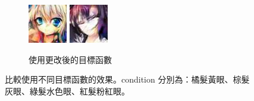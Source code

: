 \documentclass[fleqn,a4paper,12pt]{article}
\begin{document}
\begin{figure}[H]
\begin{subfigure}{0.45\textwidth}
  \includegraphics[width=0.2\linewidth]{imgs/iwgan-230-max-loss/4-5-0.jpg}
  \includegraphics[width=0.2\linewidth]{imgs/iwgan-230-max-loss/5-3-0.jpg}
  \caption{使用更改後的目標函數}
\end{subfigure}
\caption{比較使用不同目標函數的效果。condition 分別為：橘髮黃眼、棕髮灰眼、綠髮水色眼、紅髮粉紅眼。}
\label{fig:compare-obj}
\end{figure}
\end{document}
